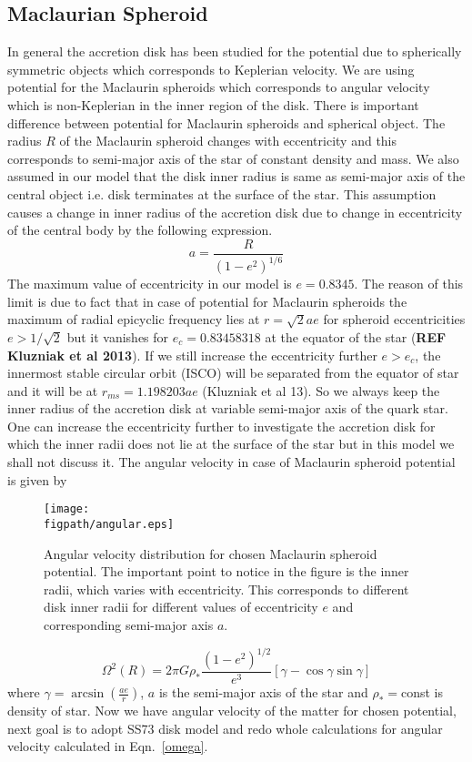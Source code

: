 \documentclass[useAMS,usenatbib]{mn2e}
\newcommand{\figpath}{./Figs/}
\newcommand{\mref}[1]{\textbf{REF #1}}
\begin{document}
\subsection{Maclaurian Spheroid}
In general the accretion disk has been studied for the potential due to spherically symmetric objects which corresponds to Keplerian velocity. We are using potential for the Maclaurin spheroids which corresponds to angular velocity which is non-Keplerian in the inner region of the disk. There is important difference between potential for Maclaurin spheroids and spherical object. The radius $R$ of the Maclaurin spheroid changes with eccentricity and this corresponds to semi-major axis of the star of constant density and mass. We also assumed in our model that the disk inner radius is same as semi-major axis of the central object i.e. disk terminates at the surface of the star. This assumption causes a change in inner radius of the accretion disk due to change in eccentricity of the central body by the following expression.
\begin{equation}
a = \frac{R}{(1 - e^2)^{1/6}}
\end{equation}
The maximum value of eccentricity in our model is $e = 0.8345$. The reason of this limit is due to fact that in case of potential for Maclaurin spheroids the maximum of radial epicyclic frequency lies at $r = \sqrt{2}ae$ for spheroid eccentricities $e>1/\sqrt{2}$ but it vanishes for $e_c = 0.83458318$ at the equator of the star (\mref{Kluzniak et al 2013}). If we still increase the eccentricity further $e>e_c$, the innermost stable circular orbit (ISCO) will be separated from the equator of star and it will be at $r_{ms} = 1.198203ae$ (Kluzniak et al 13). So we always keep the inner radius of the accretion disk at variable semi-major axis of the quark star. One can increase the eccentricity further to investigate the accretion disk for which the inner radii does not lie at the surface of the star but in this model we shall not discuss it. The angular velocity in case of Maclaurin spheroid potential is given by
\begin{figure}
\centering
\texttt{[image: \\figpath/angular.eps]}
\caption{\small{Angular velocity distribution for chosen Maclaurin spheroid potential. The important point to notice in the figure is the inner radii, which varies with eccentricity. This corresponds to different disk inner radii for different values of eccentricity $e$ and corresponding semi-major axis $a$.}}
\label{angular}
\end{figure}
\begin{equation}
\Omega ^2 \left(R\right)= 2\pi G\rho_* \frac{(1-e^2)^{1/2}}{e^3}\left[\gamma - \cos \gamma \sin\gamma \right]
\label{omega}
\end{equation}  
where $\gamma = \arcsin (\frac{a e}{r})$, $a$ is the semi-major axis of the star and $\rho_* =$const is density of star. Now we have angular velocity of the matter for chosen potential, next goal is to adopt SS73 disk model and redo whole calculations for angular velocity calculated in Eqn.~\ref{omega}.
\end{document}
